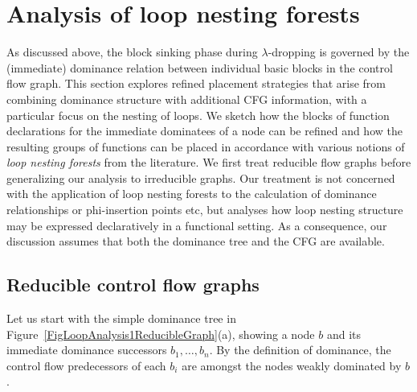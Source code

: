 \newcommand{\entrynode}[0]{\ensuremath{\mathbf{entry}}}
\newcommand{\exitnode}[0]{\ensuremath{\mathbf{exit}}}
\section{Analysis of loop nesting forests}
\label{sec:part1:semantics:LNF}
As discussed above, the block sinking phase during $\lambda$-dropping
is governed by the (immediate) dominance relation between individual
basic blocks in the control flow graph. This section explores refined
placement strategies that arise from combining dominance structure
with additional CFG information, with a particular focus on the
nesting of loops. We sketch how the blocks of function declarations
for the immediate dominatees of a node can be refined and how the
resulting groups of functions can be placed in accordance with various
notions of \emph{loop nesting forests} from the literature. We first
treat reducible flow graphs before generalizing our analysis to
irreducible graphs.  Our treatment is not concerned with the
application of loop nesting forests to the calculation of dominance
relationships or phi-insertion points etc, but analyses how loop
nesting structure may be expressed declaratively in a functional
setting. As a consequence, our discussion assumes that both the
dominance tree and the CFG are available.

\subsection{Reducible control flow graphs}
\label{sec:part1:semantics:LNF:reducible}
Let us start with the simple dominance tree in
Figure~\ref{FigLoopAnalysis1ReducibleGraph}(a), showing a node $b$ and
its immediate dominance successors $b_1, \ldots, b_n$.  By the
definition of dominance, the control flow predecessors of each $b_i$
are amongst the nodes weakly dominated by $b$.

